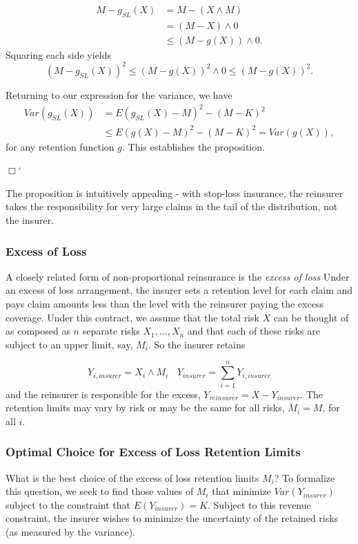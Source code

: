 \documentclass[]{book}
\theoremstyle{definition}
\theoremstyle{definition}
\theoremstyle{definition}
\theoremstyle{remark}
\begin{document}
\[
\begin{array}{ll}
M- g_{SL}(X) &= M-(X \wedge M) \\
&= (M-X) \wedge 0 \\
&\le (M-g(X)) \wedge 0 .
\end{array}
\] Squaring each side yields
\[(M- g_{SL}(X))^2 \le (M-g(X))^2 \wedge 0 \le (M-g(X))^2.\]

Returning to our expression for the variance, we have \[
\begin{array}{ll}
Var(g_{SL}(X)) &= E (g_{SL}(X) -M)^2 -  (M- K)^2 \\
&\le E (g(X) -M)^2 -  (M- K)^2 = Var(g(X)) ,
\end{array}
\] for any retention function \(g\). This establishes the proposition.

\(\Box\)`

The proposition is intuitively appealing - with stop-loss insurance, the
reinsurer takes the responsibility for very large claims in the tail of
the distribution, not the insurer.

\subsubsection{Excess of Loss}\label{excess-of-loss}

A closely related form of non-proportional reinsurance is the
\emph{excess of loss} {Under an excess of loss arrangement, the insurer
sets a retention level for each claim and pays claim amounts less than
the level with the reinsurer paying the excess} coverage. Under this
contract, we assume that the total risk \(X\) can be thought of as
composed as \(n\) separate risks \(X_1, \ldots, X_n\) and that each of
these risks are subject to an upper limit, say, \(M_i\). So the insurer
retains

\[
Y_{i,insurer} = X_i \wedge M_i \ \ \ \ Y_{insurer} = \sum_{i=1}^n Y_{i,insurer}
\] and the reinsurer is responsible for the excess,
\(Y_{reinsurer}=X - Y_{insurer}\). The retention limits may vary by risk
or may be the same for all risks, \(M_i =M\), for all \(i\).

\subsubsection{Optimal Choice for Excess of Loss Retention
Limits}\label{optimal-choice-for-excess-of-loss-retention-limits}

What is the best choice of the excess of loss retention limits \(M_i\)?
To formalize this question, we seek to find those values of \(M_i\) that
minimize \(Var(Y_{insurer})\) subject to the constraint that
\(E(Y_{insurer}) = K.\) Subject to this revenue constraint, the insurer
wishes to minimize the uncertainty of the retained risks (as measured by
the variance).
\end{document}
